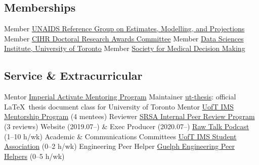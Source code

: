 \subsection{Memberships}
  {Member}
  {\href{https://epidem.org}{UNAIDS Reference Group on Estimates, Modelling, and Projections}}
  {Member}
  {\href{https://cihr-irsc.gc.ca/e/48273.html}{CIHR Doctoral Research Awards Committee}}
  {Member}
  {\href{https://datasciences.utoronto.ca/}{Data Sciences Institute, University of Toronto}}
  {Member}
  {\href{https://smdm.org/}{Society for Medical Decision Making}}
\subsection{Service \& Extracurricular}
  {Mentor}
  {\href{https://www.imperial.ac.uk/students/academic-support/graduate-school/wellbeing-and-support/activate-student-mentoring-programme/}
        {Imperial Activate Mentoring Program}}
  {Maintainer}
  {\href{https://www.ctan.org/pkg/ut-thesis}{ut-thesis}: official \LaTeX\ thesis document class for University of Toronto}
  {Mentor} %
  {\href{https://ims.utoronto.ca/ims-p2p-mentorship}{UofT IMS Mentorship Program} (4 mentees)}
  {Reviewer} %
  {\href{https://research.unityhealth.to/future-students-trainees/st-michaels-hospital-research-student-association}
        {SRSA Internal Peer Review Program} (3 reviews)}
  {Website \textnormal{(2019.07--)} \& Exec Producer \textnormal{(2020.07--)}}
  {\href{https://www.rawtalkpodcast.com}{Raw Talk Podcast} (1--10 h/wk)}
  {Academic \& Communications Committees}
  {\href{https://imssa.ca}{UofT IMS Student Association} (0--2 h/wk)}
  {Engineering Peer Helper}
  {\href{https://www.uoguelph.ca/engineering/content/current/peer-helper}{Guelph Engineering Peer Helpers} (0--5 h/wk)}
